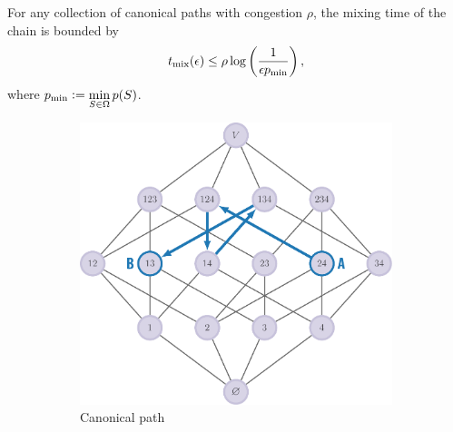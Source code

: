 \begin{theorem} \label{thm:cpath}
  For any collection of canonical paths with congestion $\rho$, the mixing time of the chain is bounded by
  \begin{align*}
  	t_{\mathrm{mix}}(\epsilon) \leq \rho \log\left(\frac{1}{\epsilon p_{\mathrm{min}}}\right),
  \end{align*}
where $p_{\mathrm{min}} \vcentcolon= \displaystyle\min_{S \in \Omega}p(S)$.
\end{theorem}

\renewcommand{\subflen}{0.48\textwidth}
\begin{figure}[tbp]
  \begin{subfigure}[b]{\subflen}
    \centering
    \includegraphics[width=\textwidth]{figures/gibbs/cp_easy_path_4.pdf}
    \caption{Canonical path}
    \label{fig:cong1}
  \end{subfigure}\hspace{1em}
  \begin{subfigure}[b]{\subflen}
    \centering

\end{subfigure}
\end{figure}
